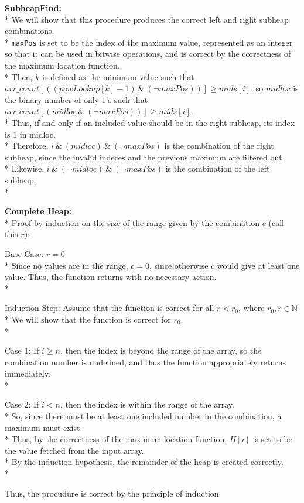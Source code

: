\documentclass[letterpaper, reqno, 11pt]{article}
\newcommand{\NN}{\mathbb{N}}
\begin{document}
\begin{description}
	\pagebreak
	\item{\bf SubheapFind:}\\*
	We will show that this procedure produces the correct left and right subheap combinations.\\*
	\verb|maxPos| is set to be the index of the maximum value, represented as an integer so that
	it can be used in bitwise operations, and is correct by the correctness of the maximum location
	function.\\*
	Then, $k$ is defined as the minimum value such that
	$arr\_count[((powLookup[k]-1)\ \&\ (\neg maxPos))]\geq mids[i]$,
	so $midloc$ is the binary number of only $1$'s such that
	$arr\_count[(midloc\ \&\ (\neg maxPos))]\geq mids[i]$.\\*
	Thus, if and only if an included value should be in the right subheap, its index is $1$ in midloc.\\*
	Therefore, $i\ \&\ (midloc)\ \&\ (\neg maxPos)$ is the combination of the right subheap, since the
	invalid indeces and the previous maximum are filtered out.\\*
	Likewise, $i\ \&\ (\neg midloc)\ \&\ (\neg maxPos)$ is the combination of the left subheap.\\*

	\item{\bf Complete Heap:}\\*
	Proof by induction on the size of the range given by the combination $c$ (call this $r$):
	\begin{description}
		\item{Base Case:} $r=0$\\*
		Since no values are in the range, $c=0$, since otherwise $c$ would give at least one value.
		Thus, the function returns with no necessary action.\\*
		\item{Induction Step:} Assume that the function is correct for all $r<r_0$, where $r_0,r\in\NN$\\*
		We will show that the function is correct for $r_0$.\\*
		\begin{description}
			\item{Case 1:} If $i\geq n$, then the index is beyond the range of the array,
			so the combination number is undefined,
			and thus the function appropriately returns immediately.\\*
			\item{Case 2:} If $i<n$, then the index is within the range of the array.\\*
			So, since there must be at least one included number in the combination, a maximum
			must exist.\\*
			Thus, by the correctness of the maximum location function, $H[i]$ is set to be the value
			fetched from the input array.\\*
			By the induction hypothesis, the remainder of the heap is created correctly.\\*
		\end{description}
	\end{description}
	Thus, the procudure is correct by the principle of induction.


\end{description}
\end{document}
